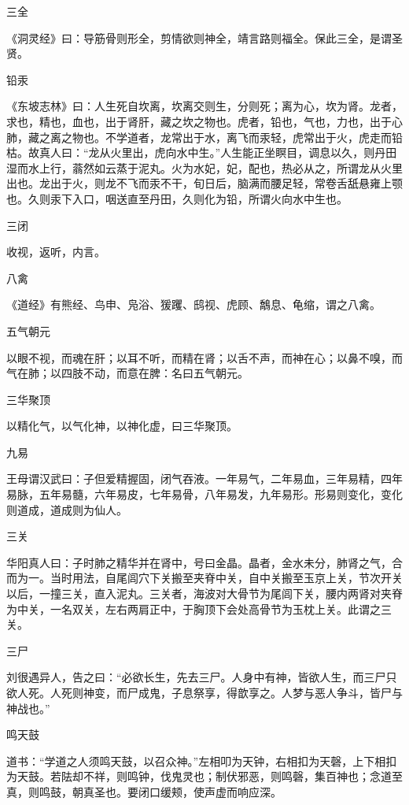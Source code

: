 \documentclass[a4paper,12pt,UTF8,twoside]{ctexbook}
\begin{document}
    三全
    
    《洞灵经》曰：导筋骨则形全，剪情欲则神全，靖言路则福全。保此三全，是谓圣贤。
    
    铅汞
    
    《东坡志林》曰：人生死自坎离，坎离交则生，分则死；离为心，坎为肾。龙者，求也，精也，血也，出于肾肝，藏之坎之物也。虎者，铅也，气也，力也，出于心肺，藏之离之物也。不学道者，龙常出于水，离飞而汞轻，虎常出于火，虎走而铅枯。故真人曰：“龙从火里出，虎向水中生。”人生能正坐瞑目，调息以久，则丹田湿而水上行，蓊然如云蒸于泥丸。火为水妃，妃，配也，热必从之，所谓龙从火里出也。龙出于火，则龙不飞而汞不干，旬日后，脑满而腰足轻，常卷舌舐悬雍上颚也。久则汞下入口，咽送直至丹田，久则化为铅，所谓火向水中生也。
    
    三闭
    
    收视，返听，内言。
    
    八禽
    
    《道经》有熊经、鸟申、凫浴、猨躩、鸱视、虎顾、鷮息、龟缩，谓之八禽。
    
    五气朝元
    
    以眼不视，而魂在肝；以耳不听，而精在肾；以舌不声，而神在心；以鼻不嗅，而气在肺；以四肢不动，而意在脾：名曰五气朝元。
    
    三华聚顶
    
    以精化气，以气化神，以神化虚，曰三华聚顶。
    
    九易
    
    王母谓汉武曰：子但爱精握固，闭气吞液。一年易气，二年易血，三年易精，四年易脉，五年易髓，六年易皮，七年易骨，八年易发，九年易形。形易则变化，变化则道成，道成则为仙人。
    
    三关
    
    华阳真人曰：子时肺之精华并在肾中，号曰金晶。晶者，金水未分，肺肾之气，合而为一。当时用法，自尾闾穴下关搬至夹脊中关，自中关搬至玉京上关，节次开关以后，一撞三关，直入泥丸。三关者，海波对大骨节为尾闾下关，腰内两肾对夹脊为中关，一名双关，左右两肩正中，于胸顶下会处高骨节为玉枕上关。此谓之三关。
    
    三尸
    
    刘很遇异人，告之曰：“必欲长生，先去三尸。人身中有神，皆欲人生，而三尸只欲人死。人死则神变，而尸成鬼，子息祭享，得歆享之。人梦与恶人争斗，皆尸与神战也。”
    
    鸣天鼓
    
    道书：“学道之人须鸣天鼓，以召众神。”左相叩为天钟，右相扣为天磬，上下相扣为天鼓。若阹却不祥，则鸣钟，伐鬼灵也；制伏邪恶，则鸣磬，集百神也；念道至真，则鸣鼓，朝真圣也。要闭口缓颊，使声虚而响应深。
    
\end{document}
